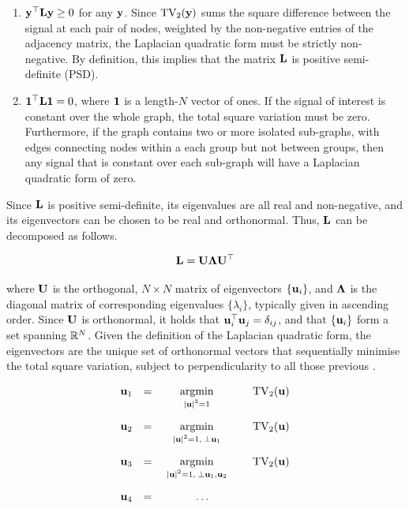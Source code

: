 \begin{enumerate}
    \item $\mathbf{y}^\top \mathbf{L} \mathbf{y} \geq 0$ for any $\mathbf{y}$. Since $\text{TV}_2(\mathbf{y})$ sums the square difference between the signal at each pair of nodes, weighted by the non-negative entries of the adjacency matrix, the Laplacian quadratic form must be strictly non-negative. By definition, this implies that the matrix $\mathbf{L}$ is positive semi-definite (PSD). 
    \item $\mathbf{1}^\top \mathbf{L} \mathbf{1} = 0$, where $\mathbf{1}$ is a length-$N$ vector of ones. If the signal of interest is constant over the whole graph, the total square variation must be zero. Furthermore, if the graph contains two or more isolated sub-graphs, with edges connecting nodes within a each group but not between groups, then any signal that is constant over each sub-graph will have a Laplacian quadratic form of zero. 
\end{enumerate}

Since $\mathbf{L}$ is positive semi-definite, its eigenvalues are all real and non-negative, and its eigenvectors can be chosen to be real and orthonormal. Thus, $\mathbf{L}$ can be decomposed as follows. 

\begin{equation}
    \mathbf{L} = \mathbf{U} \mathbf{\Lambda} \mathbf{U}^\top
\end{equation}

where $\mathbf{U}$ is the orthogonal, $N \times N$ matrix of eigenvectors $\{\mathbf{u}_i\}$, and $\mathbf{\Lambda}$ is the diagonal matrix of corresponding eigenvalues $\{\lambda_i\}$, typically given in ascending order. Since $\mathbf{U}$ is orthonormal, it holds that $\mathbf{u}_i^\top \mathbf{u}_j = \delta_{ij}$, and that $\{\mathbf{u}_i\}$ form a set spanning $\mathbb{R}^N$. Given the definition of the Laplacian quadratic form, the eigenvectors are the unique set of orthonormal vectors that sequentially minimise the total square variation, subject to perpendicularity to all those previous \citep{Spielman2019}. 


$$
\begin{matrix}
    \uu_1 & = & \underset{\raisebox{-0.1cm} { $ \scriptstyle |\uu|^2 = 1$ }}{\text{argmin}} \quad & \text{TV}_2(\uu) \\[0.7cm]
    \uu_2 & = & \underset{\raisebox{-0.1cm} { $ \scriptstyle |\uu|^2 = 1, \; \perp \uu_1$ }}{\text{argmin}} \quad & \text{TV}_2(\uu) \\[0.7cm]
    \uu_3 & = & \underset{\raisebox{-0.1cm} { $ \scriptstyle |\uu|^2 = 1, \;\perp \uu_1, \uu_2$ }}{\text{argmin}} \quad & \text{TV}_2(\uu) \\[0.7cm]
    \uu_4 & = & \ldots
\end{matrix}
$$

